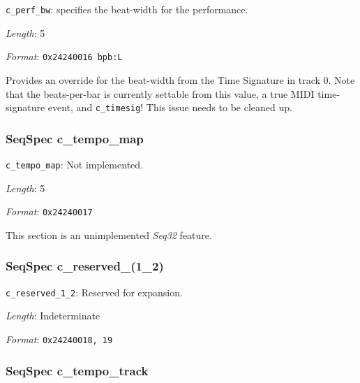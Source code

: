    \begin{description}
      \item \texttt{c\_perf\_bw}:
         specifies the beat-width for the performance.
      \item \textsl{Length}: 5
      \item \textsl{Format}: \texttt{0x24240016 bpb:L}
   \end{description}

   Provides an override for the beat-width from the Time Signature in track 0.
   Note that the beats-per-bar is currently settable from this value,
   a true MIDI time-signature event, and \texttt{c\_timesig}!
   This issue needs to be cleaned up.

\subsubsection{SeqSpec c\_tempo\_map}
\label{subsubsec:midi_format_track_seqspec_tempo_map}

   \begin{description}
      \item \texttt{c\_tempo\_map}: Not implemented.
      \item \textsl{Length}: 5
      \item \textsl{Format}: \texttt{0x24240017}
   \end{description}

   This section is an unimplemented \textsl{Seq32} feature.

\subsubsection{SeqSpec c\_reserved\_(1\_2)}
\label{subsubsec:midi_format_track_seqspec_reserved_1_2}

   \begin{description}
      \item \texttt{c\_reserved\_1\_2}: Reserved for expansion.
      \item \textsl{Length}: Indeterminate
      \item \textsl{Format}: \texttt{0x24240018, 19}
   \end{description}

\subsubsection{SeqSpec c\_tempo\_track}
\label{subsubsec:midi_format_track_seqspec_tempo_track}


